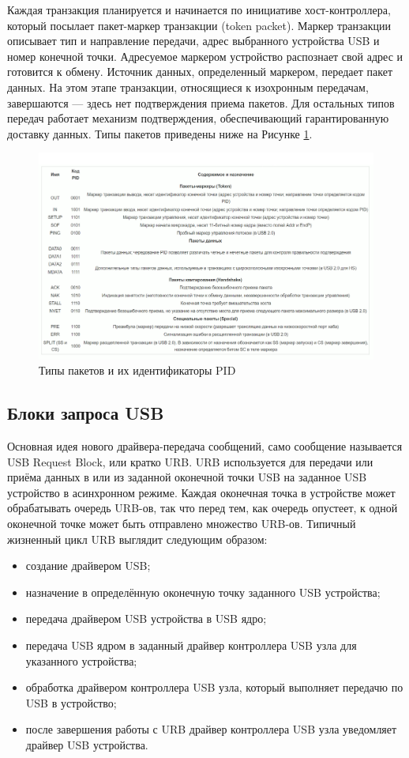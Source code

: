  Каждая транзакция планируется и начинается по инициативе хост-контроллера, который посылает пакет-маркер транзакции (token packet). Маркер транзакции описывает тип и направление передачи, адрес выбранного устройства USB и номер конечной точки. Адресуемое маркером устройство распознает свой адрес и готовится к обмену. Источник данных, определенный маркером, передает пакет данных. На этом этапе транзакции, относящиеся к изохронным передачам, завершаются — здесь нет подтверждения приема пакетов. Для остальных типов передач работает механизм подтверждения, обеспечивающий гарантированную доставку данных\cite{usb}. Типы пакетов приведены ниже на Рисунке \ref{packets-types}.
\begin{figure}[h!]
	\centering
	\includegraphics[scale=0.46]{img/packets-types.png}
	\caption{Типы пакетов и их идентификаторы PID}
	\label{packets-types}
\end{figure}\par
\newpage
\subsection{Блоки запроса USB}
Основная идея нового драйвера-передача сообщений, само сообщение называется USB Request Block, или кратко  URB.   URB используется для передачи или приёма данных в или из заданной оконечной точки USB
на заданное USB устройство в асинхронном режиме. Каждая оконечная точка в
устройстве может обрабатывать очередь   URB-ов, так что перед тем, как очередь опустеет, к
одной оконечной точке может быть отправлено множество   URB-ов. Типичный жизненный цикл
  URB выглядит следующим образом:
\begin{itemize}
	\item создание драйвером USB;
	\item назначение в определённую оконечную точку заданного USB устройства;
	\item передача драйвером USB устройства в USB ядро;
	\item передача USB ядром в заданный драйвер контроллера USB узла для указанного
	устройства;
	\item обработка драйвером контроллера USB узла, который выполняет передачю по USB в
	устройство;
	\item после завершения работы с  URB драйвер контроллера USB узла уведомляет драйвер USB
	устройства.
\end{itemize}

